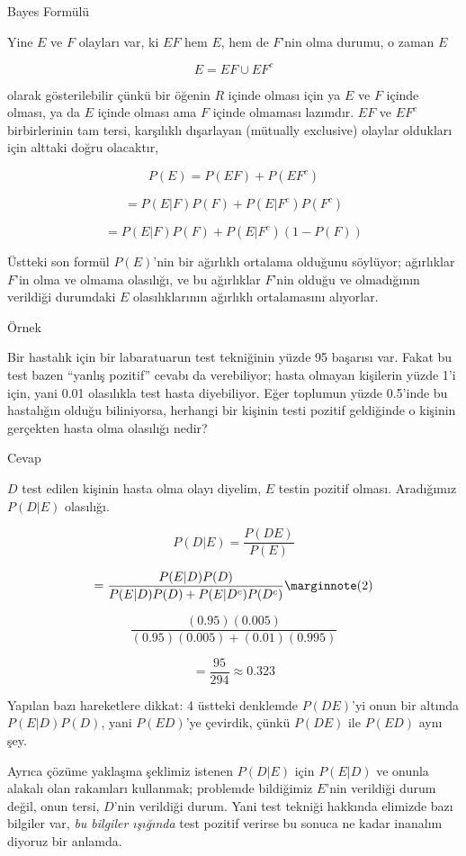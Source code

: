 \documentclass[12pt,fleqn]{article}\usepackage{../../common}
\begin{document}
Bayes Formülü

Yine $E$ ve $F$ olayları var, ki $EF$ hem $E$, hem de $F$'nin olma durumu, o
zaman $E$

$$ E = EF \cup EF^c $$

olarak gösterilebilir çünkü bir öğenin $R$ içinde olması için ya $E$ ve $F$
içinde olması, ya da $E$ içinde olması ama $F$ içinde olmaması lazımdır. $EF$ ve
$EF^c$ birbirlerinin tam tersi, karşılıklı dışarlayan (mütually exclusive)
olaylar oldukları için alttaki doğru olacaktır,

$$ P(E) = P(EF) + P(EF^c) $$

$$ = P(E|F)P(F) + P(E|F^c)P(F^c) $$

$$ = P(E|F)P(F) + P(E|F^c)(1-P(F)) $$

Üstteki son formül $P(E)$'nin bir ağırlıklı ortalama olduğunu söylüyor;
ağırlıklar $F$'in olma ve olmama olasılığı, ve bu ağırlıklar $F$'nin olduğu ve
olmadığının verildiği durumdaki $E$ olasılıklarının ağırlıklı ortalamasını
alıyorlar.

Örnek

Bir hastalık için bir labaratuarun test tekniğinin yüzde 95 başarısı var. Fakat
bu test bazen ``yanlış pozitif'' cevabı da verebiliyor; hasta olmayan kişilerin
yüzde 1'i için, yani 0.01 olasılıkla test hasta diyebiliyor. Eğer toplumun yüzde
0.5'inde bu hastalığın olduğu biliniyorsa, herhangi bir kişinin testi pozitif
geldiğinde o kişinin gerçekten hasta olma olasılığı nedir?

Cevap

$D$ test edilen kişinin hasta olma olayı diyelim, $E$ testin pozitif
olması. Aradığımız $P(D|E)$ olasılığı.

$$ P(D|E) = \frac{P(DE)}{P(E)} $$

$$
= \frac{P(E|D)P(D)}
{P(E|D)P(D) + P(E|D^c)P(D^c)}
\mlabel{2}
$$

$$
\frac{(0.95)(0.005)}
{(0.95)(0.005) + (0.01)(0.995)} $$

$$ = \frac{95}{294} \approx 0.323 $$

Yapılan bazı hareketlere dikkat: 4 üstteki denklemde $P(DE)$'yi onun bir altında
$P(E|D)P(D)$, yani $P(ED)$'ye çevirdik, çünkü $P(DE)$ ile $P(ED)$ aynı şey.

Ayrıca çözüme yaklaşma şeklimiz istenen $P(D|E)$ için $P(E|D)$ ve onunla alakalı
olan rakamları kullanmak; problemde bildiğimiz $E$'nin verildiği durum değil,
onun tersi, $D$'nin verildiği durum. Yani test tekniği hakkında elimizde bazı
bilgiler var, {\em bu bilgiler ışığında} test pozitif verirse bu sonuca ne kadar
inanalım diyoruz bir anlamda.
\end{document}
